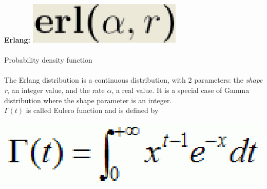 \textbf{Erlang:}
\includegraphics[scale=.5]{img/jsim/erlang_f.eps}
\\ \\
Probability density function
\\\\
The Erlang distribution is a continuous distribution, with 2 parameters: the \emph{shape r}, an integer value, and the rate \emph{$\alpha$}, a real value. It is a special case of Gamma distribution where the shape parameter is an integer.
\\
$\Gamma (t)$ is called Eulero function and is defined by \\
\begin{center}
\includegraphics[scale=.5]{img/jsim/eulergamma.eps}
\end{center}

